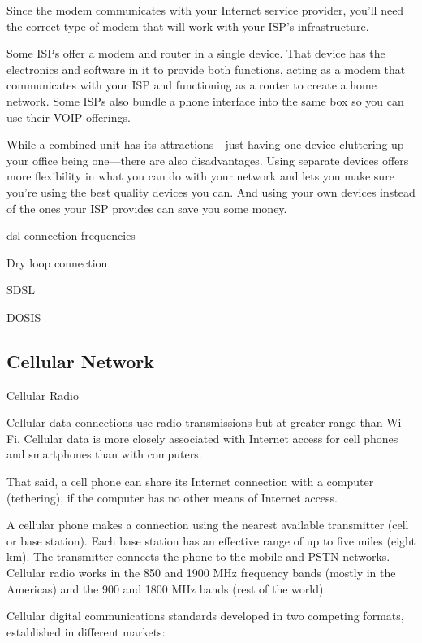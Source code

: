 Since the modem communicates with your Internet service provider, you’ll need
the correct type of modem that will work with your ISP’s infrastructure.

Some ISPs offer a modem and router in a single device. That device has the
electronics and software in it to provide both functions, acting as a modem that
communicates with your ISP and functioning as a router to create a home network.
Some ISPs also bundle a phone interface into the same box so you can use their
VOIP offerings.

While a combined unit has its attractions—just having one device cluttering up
your office being one—there are also disadvantages. Using separate devices
offers more flexibility in what you can do with your network and lets you make
sure you’re using the best quality devices you can. And using your own devices
instead of the ones your ISP provides can save you some money.


dsl connection frequencies

Dry loop connection

SDSL

DOSIS


\subsectionend

\subsection{Cellular Network}
\label{ssec:cellular_network}

Cellular Radio

Cellular data connections use radio transmissions but at greater range than
Wi-Fi. Cellular data is more closely associated with Internet access for cell
phones and smartphones than with computers.

That said, a cell phone can share its Internet connection with a computer
(tethering), if the computer has no other means of Internet access. 

A cellular phone makes a connection using the nearest available transmitter
(cell or base station). Each base station has an effective range of up to five
miles (eight km). The transmitter connects the phone to the mobile and PSTN
networks. Cellular radio works in the 850 and 1900 MHz frequency bands (mostly
in the Americas) and the 900 and 1800 MHz bands (rest of the world).

Cellular digital communications standards developed in two competing formats,
established in different markets:

